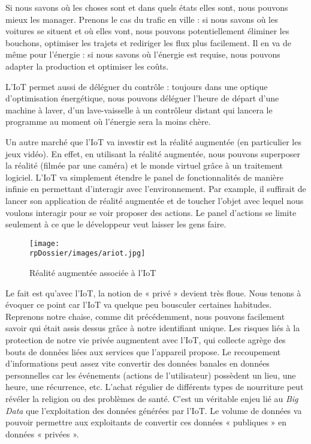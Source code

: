 Si nous savons où les choses sont et dans quels états elles sont, nous pouvons mieux les manager. Prenons le cas du trafic en ville : si nous savons où les voitures se situent et où elles vont, nous pouvons potentiellement éliminer les bouchons, optimiser les trajets et rediriger les flux plus facilement. Il en va de même pour l'énergie : si nous savons où l'énergie est requise, nous pouvons adapter la production et optimiser les coûts.


L'IoT permet aussi de déléguer du contrôle : toujours dans une optique d'optimisation énergétique, nous pouvons déléguer l'heure de départ d'une machine à laver, d'un lave-vaisselle à un contrôleur distant qui lancera le programme au moment où l'énergie sera la moins chère.


Un autre marché que l'IoT va investir est la réalité augmentée (en particulier les jeux vidéo). En effet, en utilisant la réalité augmentée, nous pouvons superposer la réalité (filmée par une caméra) et le monde virtuel grâce à un traitement logiciel. L'IoT va simplement étendre le panel de fonctionnalités de manière infinie en permettant d'interagir avec l'environnement. Par example, il suffirait de lancer son application de réalité augmentée et de toucher l'objet avec lequel nous voulons interagir pour se voir proposer des actions. Le panel d'actions se limite seulement à ce que le développeur veut laisser les gens faire.

\begin{figure}[H]
\centering
\texttt{[image: \\rpDossier/images/ariot.jpg]}
\caption{Réalité augmentée associée à l’IoT}
\label{ariot}
\end{figure}


Le fait est qu'avec l'IoT, la notion de « privé » devient très floue. Nous tenons à évoquer ce point car l'IoT va quelque peu bousculer certaines habitudes. Reprenons notre chaise, comme dit précédemment, nous pouvons facilement savoir qui était assis dessus grâce à notre identifiant unique. Les risques liés à la protection de notre vie privée augmentent avec l'IoT, qui collecte agrège des bouts de données liées aux services que l'appareil propose. Le recoupement d'informations peut assez vite convertir des données banales en données personnelles car les événements (actions de l'utilisateur) possèdent un lieu, une heure, une récurrence, etc. L'achat régulier de différents types de nourriture peut révéler la religion ou des problèmes de santé. C'est un véritable enjeu lié au \emph{Big Data} que l'exploitation des données générées par l'IoT. Le volume de données va pouvoir permettre aux exploitants de convertir ces données « publiques » en données « privées ».

